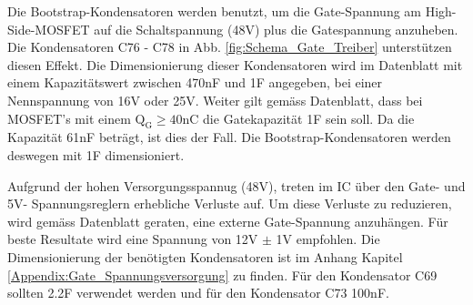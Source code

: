 

Die Bootstrap-Kondensatoren werden benutzt, um die Gate-Spannung am High-Side-MOSFET auf die Schaltspannung (48V) plus die Gatespannung anzuheben. Die Kondensatoren C76 - C78 in Abb. \ref{fig:Schema_Gate_Treiber} unterstützen diesen Effekt.
Die Dimensionierung dieser Kondensatoren wird im Datenblatt mit einem Kapazitätswert zwischen 470nF und 1\textmugreek F angegeben, bei einer Nennspannung von 16V oder 25V. Weiter gilt gemäss Datenblatt, dass bei MOSFET's mit einem $\mathrm{Q_G \geq 40nC}$ die Gatekapazität 1\textmugreek F sein soll. Da die Kapazität 61nF beträgt, ist dies der Fall. Die Bootstrap-Kondensatoren werden deswegen mit 1\textmugreek F dimensioniert. \cite[S.10]{trinamicmotion_control_gmbh__co_kg_tmc6200_2019}



Aufgrund der hohen Versorgungsspannug (48V), treten im IC über den Gate- und 5V- Spannungsreglern erhebliche Verluste auf. Um diese Verluste zu reduzieren, wird gemäss Datenblatt \cite[S.11]{trinamicmotion_control_gmbh__co_kg_tmc6200_2019} geraten, eine externe Gate-Spannung anzuhängen. Für beste Resultate wird eine Spannung von 12V $\pm$ 1V empfohlen.
Die Dimensionierung der benötigten Kondensatoren ist im Anhang Kapitel \ref{Appendix:Gate_Spannungsversorgung} zu finden. Für den Kondensator C69 sollten 2.2\textmugreek F verwendet werden und für den Kondensator C73 100nF.

